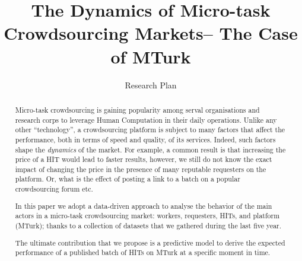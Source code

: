 \documentclass{llncs}
\begin{document}
%

\title{The Dynamics of Micro-task Crowdsourcing Markets-- The Case of MTurk}
\subtitle{Research Plan}



\author{}

\maketitle
\begin{abstract}
Micro-task crowdsourcing is gaining popularity among serval organisations and research corps to leverage Human Computation in their daily operations. Unlike any other ``technology'', a crowdsourcing platform is subject to many factors that affect the performance, both in terms of speed and quality, of its services. Indeed, such factors shape the \emph{dynamics} of the market. For example, a common result is that increasing the price of a HIT would lead to faster results, however, we still do not know the exact impact of changing the price in the presence of many reputable requesters on the platform. Or, what is the effect of posting a link to a batch on a popular crowdsourcing forum etc.

In this paper we adopt a data-driven approach to analyse the behavior of the main actors in a micro-task crowdsourcing market: workers, requesters, HITs, and platform (MTurk); thanks to a collection of datasets that we gathered during the last five year.

The ultimate contribution that we propose is a predictive model to derive the expected performance of a published batch of HITs on MTurk at a specific moment in time.

\end{abstract}

%
%
\end{document}
